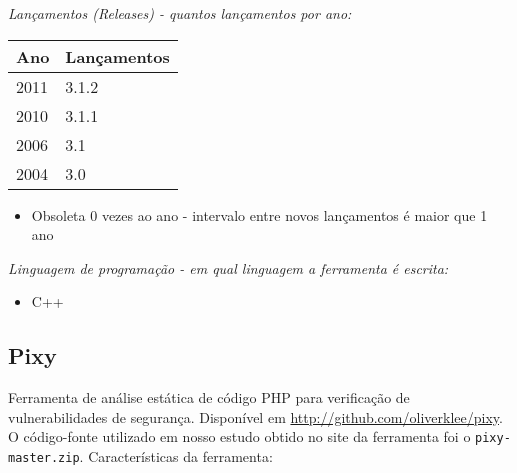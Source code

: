 \begin{description}

  \item {\it Lançamentos ({\it Releases}) - quantos lançamentos por ano:}
    \begin{table}[h!]
      \centering
      \begin{tabular}{| l | l |}
        \hline
        Ano  & Lançamentos \\
        \hline
        2011 & 3.1.2       \\
        2010 & 3.1.1       \\
        2006 & 3.1         \\
        2004 & 3.0         \\
        \hline
      \end{tabular}
    \end{table}
    \begin{itemize}
      \item Obsoleta $0$ vezes ao ano - intervalo entre novos lançamentos é maior que 1 ano
    \end{itemize}

  \item {\it Linguagem de programação - em qual linguagem a ferramenta é escrita:}
    \begin{itemize}
      \item C++
    \end{itemize}

\end{description}

\subsection{Pixy}

Ferramenta de análise estática de código PHP para verificação de
vulnerabilidades de segurança. Disponível em
\url{http://github.com/oliverklee/pixy}. O código-fonte utilizado em nosso
estudo obtido no site da ferramenta foi o \texttt{pixy-master.zip}.
Características da ferramenta:

